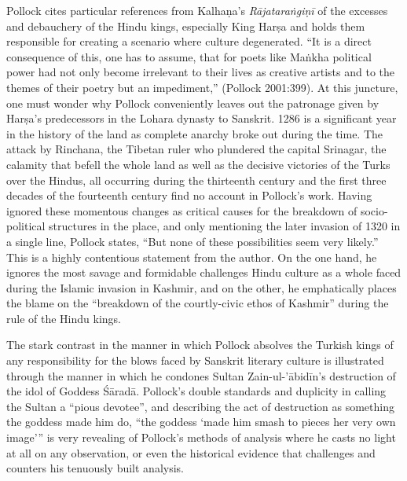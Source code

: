 Pollock cites particular references from Kalhaṇa’s {\sl Rājataraṅgiṇī} of the excesses and debauchery of the Hindu kings, especially King Harṣa and holds them responsible for creating a scenario where culture degenerated. “It is a direct consequence of this, one has to assume, that for poets like Maṅkha political power had not only become irrelevant to their lives as creative artists and to the themes of their poetry but an impediment,” (Pollock 2001:399). At this juncture, one must wonder why Pollock conveniently leaves out the patronage given by Harṣa’s predecessors in the Lohara dynasty to Sanskrit. 1286 is a significant year in the history of the land as complete anarchy broke out during the time. The attack by Rinchana, the Tibetan ruler who plundered the capital Srinagar, the calamity that befell the whole land as well as the decisive victories of the Turks over the Hindus, all occurring during the thirteenth century and the first three decades of the fourteenth century find no account in Pollock’s work. Having ignored these momentous changes as critical causes for the breakdown of socio-political structures in the place, and only mentioning the later invasion of 1320 in a single line, Pollock states, “But none of these possibilities seem very likely.” This is a highly contentious statement from the author. On the one hand, he ignores the most savage and formidable challenges Hindu culture as a whole faced during the Islamic invasion in Kashmir, and on the other, he emphatically places the blame on the “breakdown of the courtly-civic ethos of Kashmir” during the rule of the Hindu kings.

The stark contrast in the manner in which Pollock absolves the Turkish kings of any responsibility for the blows faced by Sanskrit literary culture is illustrated through the manner in which he condones Sultan Zain-ul-’ābidīn’s destruction of the idol of Goddess Śāradā. Pollock’s double standards and duplicity in calling the Sultan a “pious devotee”, and describing the act of destruction as something the goddess made him do, “the goddess ‘made him smash to pieces her very own image’” is very revealing of Pollock’s methods of analysis where he casts no light at all on any observation, or even the historical evidence that challenges and counters his tenuously built analysis.

